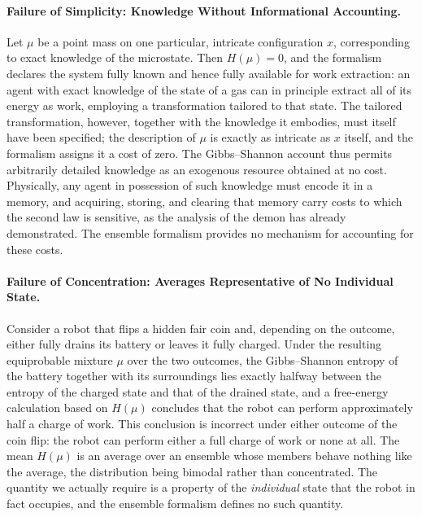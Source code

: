 \documentclass[10pt]{article}
\theoremstyle{definition}
\theoremstyle{remark}
\begin{document}
\paragraph{Failure of Simplicity: Knowledge Without Informational Accounting.} Let $\mu$ be a point mass on one particular, intricate configuration $x$, corresponding to exact knowledge of the microstate. Then $H(\mu) = 0$, and the formalism declares the system fully known and hence fully available for work extraction: an agent with exact knowledge of the state of a gas can in principle extract all of its energy as work, employing a transformation tailored to that state. The tailored transformation, however, together with the knowledge it embodies, must itself have been specified; the description of $\mu$ is exactly as intricate as $x$ itself, and the formalism assigns it a cost of zero. The Gibbs--Shannon account thus permits arbitrarily detailed knowledge as an exogenous resource obtained at no cost. Physically, any agent in possession of such knowledge must encode it in a memory, and acquiring, storing, and clearing that memory carry costs to which the second law is sensitive, as the analysis of the demon has already demonstrated. The ensemble formalism provides no mechanism for accounting for these costs.

\paragraph{Failure of Concentration: Averages Representative of No Individual State.} Consider a robot that flips a hidden fair coin and, depending on the outcome, either fully drains its battery or leaves it fully charged. Under the resulting equiprobable mixture $\mu$ over the two outcomes, the Gibbs--Shannon entropy of the battery together with its surroundings lies exactly halfway between the entropy of the charged state and that of the drained state, and a free-energy calculation based on $H(\mu)$ concludes that the robot can perform approximately half a charge of work. This conclusion is incorrect under either outcome of the coin flip: the robot can perform either a full charge of work or none at all. The mean $H(\mu)$ is an average over an ensemble whose members behave nothing like the average, the distribution being bimodal rather than concentrated. The quantity we actually require is a property of the \emph{individual} state that the robot in fact occupies, and the ensemble formalism defines no such quantity.
\end{document}

